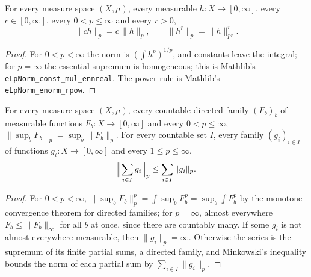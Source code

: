\begin{lemma}
\label{lem:lp-norm-homogeneity}
\leanok
For every measure space $(X, \mu)$, every measurable $h : X \to [0, \infty]$, every
$c \in [0, \infty]$, every $0 < p \leq \infty$ and every $r > 0$,
\[
  \|c h\|_p = c \, \|h\|_p, \qquad \|h^r\|_p = \|h\|_{pr}^r .
\]
\end{lemma}

\begin{proof}
\leanok
For $0 < p < \infty$ the norm is $(\int h^p)^{1/p}$, and constants leave the integral; for
$p = \infty$ the essential supremum is homogeneous; this is Mathlib's
\texttt{eLpNorm\_const\_mul\_ennreal}. The power rule is Mathlib's
\texttt{eLpNorm\_enorm\_rpow}.
\end{proof}

\begin{lemma}
\label{lem:lp-series-minkowski}
\leanok
For every measure space $(X, \mu)$, every countable directed family $(F_b)_b$ of measurable
functions $F_b : X \to [0, \infty]$ and every $0 < p \leq \infty$,
$\|\sup_b F_b\|_p = \sup_b \|F_b\|_p$. For every countable set $I$, every family
$(g_i)_{i \in I}$ of functions $g_i : X \to [0, \infty]$ and every $1 \leq p \leq \infty$,
\[
  \Bigl\| \sum_{i \in I} g_i \Bigr\|_p \leq \sum_{i \in I} \|g_i\|_p .
\]
\end{lemma}

\begin{proof}
\leanok
For $0 < p < \infty$, $\|\sup_b F_b\|_p^p = \int \sup_b F_b^p = \sup_b \int F_b^p$ by the
monotone convergence theorem for directed families; for $p = \infty$, almost everywhere
$F_b \leq \|F_b\|_\infty$ for all $b$ at once, since there are countably many. If some $g_i$ is
not almost everywhere measurable, then $\|g_i\|_p = \infty$. Otherwise the series is the
supremum of its finite partial sums, a directed family, and Minkowski's inequality bounds the
norm of each partial sum by $\sum_{i \in I} \|g_i\|_p$.
\end{proof}

